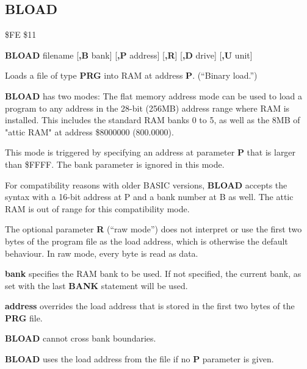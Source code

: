 \subsection{BLOAD}
\begin{description}[leftmargin=2cm,style=nextline]
\item [Token:]    \$FE \$11

\item [Format:]   {\bf BLOAD} filename [{\bf,B} bank] [{\bf,P} address] [{\bf,R}] [{\bf,D} drive] [{\bf,U} unit]

\item [Usage:]    Loads a file of type {\bf PRG} into RAM at address {\bf P}. (``Binary load.'')

                  {\bf BLOAD} has two modes: The flat memory address mode can be used to load a program to any address in the 28-bit (256MB) address range where RAM is installed. This includes the standard RAM banks 0 to 5, as well as the 8MB of "attic RAM" at address \$8000000 (800.0000).

                  This mode is triggered by specifying an address at parameter {\bf P} that is larger than \$FFFF. The bank parameter is ignored in this mode.

                  For compatibility reasons with older BASIC versions, {\bf BLOAD} accepts the syntax with a 16-bit address at P and a bank number at B as well. The attic RAM is out of range for this compatibility mode.

                  The optional parameter {\bf R} (``raw mode'') does not interpret or use the first two bytes of the program file as the load address, which is otherwise the default behaviour. In raw mode, every byte is read as data.

                  \filenamedefinition

                  {\bf bank} specifies the RAM bank to be used. If not specified, the current bank, as set with the last {\bf BANK} statement will be used.

                  {\bf address} overrides the load address that is stored in the first two bytes of the {\bf PRG} file.

                  \drivedefinition

                  \unitdefinition

\item [Remarks:]  {\bf BLOAD} cannot cross bank boundaries.

                  {\bf BLOAD} uses the load address from the file if no {\bf P} parameter is given.


\end{description}
